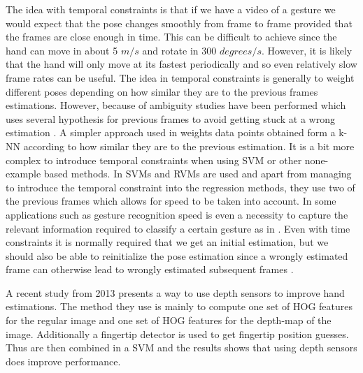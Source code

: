 \documentclass[a4paper,11pt]{kth-mag}
\begin{document}
The idea with temporal constraints is that if we have a video of a gesture we would expect that the pose changes smoothly from frame to frame provided that the frames are close enough in time.
This can be difficult to achieve since the hand can move in about 5 $m/s$ and rotate in 300 $degrees/s$\cite{review}.
However, it is likely that the hand will only move at its fastest periodically and so even relatively slow frame rates can be useful.
The idea in temporal constraints is generally to weight different poses depending on how similar they are to the previous frames estimations.
However, because of ambiguity studies have been performed which uses several hypothesis for previous frames to avoid getting stuck at a wrong estimation \cite{review,nonparametric}.
A simpler approach used in \cite{monocular} weights data points obtained form a k-NN according to how similar they are to the previous estimation.
It is a bit more complex to introduce temporal constraints when using SVM or other none-example based methods.
In \cite{recovering3D} SVMs and RVMs are used and apart from managing to introduce the temporal constraint into the regression methods, they use two of the previous frames which allows for speed to be taken into account.
In some applications such as gesture recognition speed is even a necessity to capture the relevant information required to classify a certain gesture as in \cite{temporal}.
Even with time constraints it is normally required that we get an initial estimation, but we should also be able to reinitialize the pose estimation since a wrongly estimated frame can otherwise lead to wrongly estimated subsequent frames \cite{review}.

A recent study from 2013 presents a way to use depth sensors to improve hand estimations\cite{RGB}.
The method they use is mainly to compute one set of HOG features for the regular image and one set of HOG features for the depth-map of the image.
Additionally a fingertip detector is used to get fingertip position guesses.
Thus are then combined in a SVM and the results shows that using depth sensors does improve performance.
\end{document}

